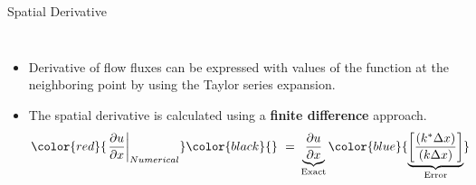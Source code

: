 \begin{frame}{Spatial Derivative}
  \begin{columns}
    \begin{itemize}
      \item Derivative of flow fluxes can be expressed with values of the function at the 
            neighboring point by using the Taylor series expansion. 
      \item The spatial derivative is calculated using a \textbf{finite difference} approach.
      \begin{equation*}
		    \begin{split}
			    \color{red}{\left.\frac{\partial{u}}{\partial{x}}\right|_{Numerical}}\color{black}{}~=&~
            \underbrace{\frac{\partial{u}}{\partial{x}}}_{\text{Exact}}\color{blue}
            {\underbrace{\left[\frac{\left(k^*\Delta{x}\right)}{\left(k\Delta{x}\right)}\right]}_{
            \text{Error}}}
		    \end{split}
		  \end{equation*}
    \end{itemize}
		\begin{figure}[htbp!]
		  \begin{center}
    	  \includegraphics[width=1.0\textwidth]{Figures/Phase_Speed.eps}
    	\end{center}
		\end{figure} 
  \end{columns}
\end{frame}

